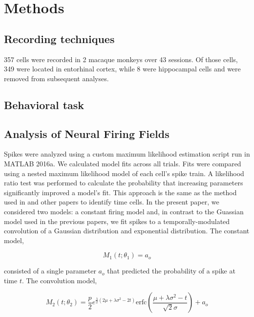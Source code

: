 \documentclass{apa}
\begin{document}
\section{Methods}

\subsection{Recording techniques}


357 cells were recorded in 2 macaque monkeys over 43 sessions. Of those cells,
349 were located in entorhinal cortex, 
while 8 were hippocampal cells and were
removed from subsequent analyses. 

\subsection{Behavioral task}


\subsection{Analysis of Neural Firing Fields}

Spikes were analyzed using a custom maximum likelihood estimation script run
in MATLAB 2016a. We calculated model fits across all trials. Fits were
compared using a nested maximum likelihood model of each cell's spike train. A
likelihood ratio test was performed to calculate the probability that
increasing parameters significantly improved a model's fit. This approach is
the same as the method used in  and other papers
\cite{TigaEtal17b,TigaEtal18a} to identify time cells. In the present paper, we
considered two models: a constant firing model and, in contrast to the
Guassian model used in the previous papers, we fit spikes to a
temporally-modulated convolution of a Gaussian distribution and exponential
distribution. The constant model,


\begin{equation}
M_1(t; \theta_1) = a_o
\end{equation}

consisted of a single parameter $a_o$ that predicted the probability of a spike at time $t$. The convolution model, 

\begin{equation}
M_2(t; \theta_2) =
\frac{p}{2}e^{\frac{\lambda}{2}(2\mu+\lambda\sigma^2-2t)}\text{erfc}(\frac{\mu+\lambda\sigma^2-t}{\sqrt{2}\sigma})+a_o
\end{equation}
\end{document}

